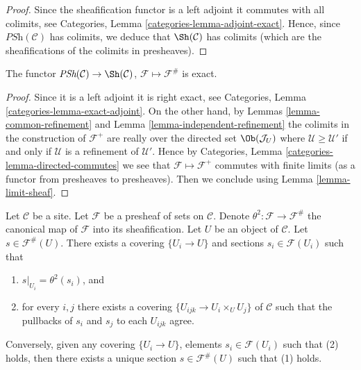 \begin{proof}
Since the sheafification functor is a left adjoint it commutes
with all colimits, see Categories,
Lemma \ref{categories-lemma-adjoint-exact}.
Hence, since $\textit{PSh}(\mathcal{C})$ has colimits, we deduce
that $\Sh(\mathcal{C})$ has colimits (which are the
sheafifications of the colimits in presheaves).
\end{proof}

\begin{lemma}
\label{lemma-sheafification-exact}
The functor $\textit{PSh}(\mathcal{C}) \to \Sh(\mathcal{C})$,
$\mathcal{F} \mapsto \mathcal{F}^\#$ is exact.
\end{lemma}

\begin{proof}
Since it is a left adjoint it is right exact, see
Categories, Lemma \ref{categories-lemma-exact-adjoint}.
On the other hand, by Lemmas \ref{lemma-common-refinement}
and Lemma \ref{lemma-independent-refinement} the colimits
in the construction of $\mathcal{F}^+$ are really over the
directed set $\Ob(\mathcal{J}_U)$ where
$\mathcal{U} \geq \mathcal{U}'$ if and only if
$\mathcal{U}$ is a refinement of $\mathcal{U}'$. Hence by
Categories, Lemma \ref{categories-lemma-directed-commutes}
we see that $\mathcal{F} \mapsto \mathcal{F}^+$ commutes
with finite limits (as a functor from presheaves to
presheaves). Then we conclude using
Lemma \ref{lemma-limit-sheaf}.
\end{proof}

\begin{lemma}
\label{lemma-sections-sheafification}
Let $\mathcal{C}$ be a site.
Let $\mathcal{F}$ be a presheaf of sets on $\mathcal{C}$.
Denote $\theta^2 : \mathcal{F} \to \mathcal{F}^\#$ the canonical
map of $\mathcal{F}$ into its sheafification.
Let $U$ be an object of $\mathcal{C}$.
Let $s \in \mathcal{F}^\#(U)$. There exists
a covering $\{U_i \to U\}$ and sections
$s_i \in \mathcal{F}(U_i)$ such that
\begin{enumerate}
\item $s|_{U_i} = \theta^2(s_i)$, and
\item for every $i, j$ there exists a covering
$\{U_{ijk} \to U_i \times_U U_j\}$ of $\mathcal{C}$ such that
the pullbacks of $s_i$ and $s_j$ to each $U_{ijk}$ agree.
\end{enumerate}
Conversely, given any covering $\{U_i \to U\}$, elements
$s_i \in \mathcal{F}(U_i)$ such that (2) holds, then there
exists a unique section $s \in \mathcal{F}^\#(U)$ such
that (1) holds.
\end{lemma}


